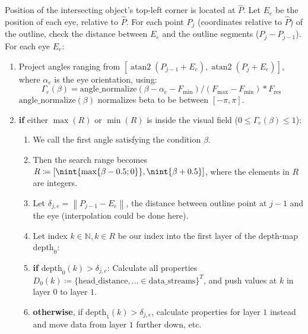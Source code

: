 \documentclass[9pt,lineno]{elife}
\newcommand{\norm}[1]{\left\lVert#1\right\rVert}
\DeclarePairedDelimiter{\nint}\lfloor\rceil
\DeclareMathOperator{\atantwo}{atan2}
\begin{document}
\begin{appendixbox}
Position of the intersecting object's top-left corner is located at $\hat{P}$. Let $E_e$ be the position of each eye, relative to $\hat{P}$. For each point $P_j$ (coordinates relative to $\hat{P}$) of the outline, check the distance between $E_e$ and the outline segments ($P_j - P_{j-1}$). For each eye $E_e$:

\begin{enumerate}
    \item Project angles ranging from $\left[\atantwo(P_{j-1} + E_e), \atantwo(P_j + E_e)\right]$, where $\alpha_e$ is the eye orientation, using:
    $$ \Gamma_{e}(\beta) = \mathrm{angle\_normalize}\left(\beta - \alpha_e - F_\mathrm{min}\right) / (F_\mathrm{max} - F_\mathrm{min}) * F_\mathrm{res} $$
    $\mathrm{angle\_normalize}(\beta)$ normalizes beta to be between $[-\pi,\pi]$.
    
    \item \textbf{if} either $\max(R)$ or $\min(R)$ is inside the visual field ($0 \leq \Gamma_e(\beta) \leq 1$):
    \begin{enumerate}
        \item We call the first angle satisfying the condition $\beta$.
        \item Then the search range becomes $R \coloneqq \left[\nint{\max\{\beta-0.5; 0\}}, \nint{\beta+0.5} \right]$, where the elements in $R$ are integers.
        \item Let $\delta_{j,e} = \norm{ P_{j-1} - E_e } $, the distance between outline point at $j-1$ and the eye (interpolation could be done here).
        \item Let index $k \in \mathbb{N}, k \in R$ be our index into the first layer of the depth-map $\mathrm{depth}_0$:
        \item \textbf{if} $\mathrm{depth}_0(k) > \delta_{j,e}$: Calculate all properties $D_0(k) \coloneqq \{ \mathrm{head\_distance}, \dots \in \mathrm{data\_streams} \}^T$, and push values at $k$ in layer $0$ to layer $1$.
        \item \textbf{otherwise}, if $\mathrm{depth}_1(k) > \delta_{j,e}$, calculate properties for layer $1$ instead and move data from layer $1$ further down, etc.
    \end{enumerate}
\end{enumerate}


\end{appendixbox}
\end{document}

